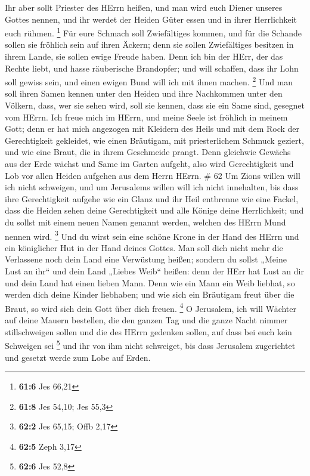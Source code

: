  Ihr aber sollt Priester des HErrn heißen, und man wird euch
Diener unseres Gottes nennen, und ihr werdet der Heiden Güter essen und
in ihrer Herrlichkeit euch rühmen. \footnote{\textbf{61:6} Jes 66,21}
 Für eure Schmach soll Zwiefältiges kommen, und für die
Schande sollen sie fröhlich sein auf ihren Äckern; denn sie sollen
Zwiefältiges besitzen in ihrem Lande, sie sollen ewige Freude haben.
 Denn ich bin der HErr, der das Rechte liebt, und hasse
räuberische Brandopfer; und will schaffen, dass ihr Lohn soll gewiss
sein, und einen ewigen Bund will ich mit ihnen machen. \footnote{\textbf{61:8}
  Jes 54,10; Jes 55,3}  Und man soll ihren Samen kennen
unter den Heiden und ihre Nachkommen unter den Völkern, dass, wer sie
sehen wird, soll sie kennen, dass sie ein Same sind, gesegnet vom HErrn.
 Ich freue mich im HErrn, und meine Seele ist fröhlich in
meinem Gott; denn er hat mich angezogen mit Kleidern des Heils und mit
dem Rock der Gerechtigkeit gekleidet, wie einen Bräutigam, mit
priesterlichem Schmuck geziert, und wie eine Braut, die in ihrem
Geschmeide prangt.  Denn gleichwie Gewächs aus der Erde
wächst und Same im Garten aufgeht, also wird Gerechtigkeit und Lob vor
allen Heiden aufgehen aus dem Herrn HErrn. \# 62  Um Zions
willen will ich nicht schweigen, und um Jerusalems willen will ich nicht
innehalten, bis dass ihre Gerechtigkeit aufgehe wie ein Glanz und ihr
Heil entbrenne wie eine Fackel,  dass die Heiden sehen deine
Gerechtigkeit und alle Könige deine Herrlichkeit; und du sollst mit
einem neuen Namen genannt werden, welchen des HErrn Mund nennen wird.
\footnote{\textbf{62:2} Jes 65,15; Offb 2,17}  Und du wirst
sein eine schöne Krone in der Hand des HErrn und ein königlicher Hut in
der Hand deines Gottes.  Man soll dich nicht mehr die
Verlassene noch dein Land eine Verwüstung heißen; sondern du sollst
„Meine Lust an ihr`` und dein Land „Liebes Weib`` heißen: denn der HErr
hat Lust an dir und dein Land hat einen lieben Mann.  Denn
wie ein Mann ein Weib liebhat, so werden dich deine Kinder liebhaben;
und wie sich ein Bräutigam freut über die Braut, so wird sich dein Gott
über dich freuen. \footnote{\textbf{62:5} Zeph 3,17}  O
Jerusalem, ich will Wächter auf deine Mauern bestellen, die den ganzen
Tag und die ganze Nacht nimmer stillschweigen sollen und die des HErrn
gedenken sollen, auf dass bei euch kein Schweigen sei \footnote{\textbf{62:6}
  Jes 52,8}  und ihr von ihm nicht schweiget, bis dass
Jerusalem zugerichtet und gesetzt werde zum Lobe auf Erden. 
